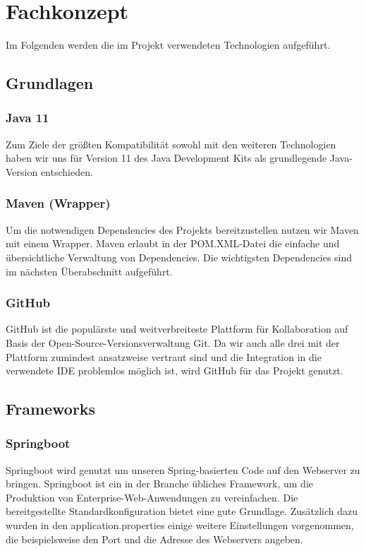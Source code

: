

\section{Fachkonzept}
\label{Technologien}

Im Folgenden werden die im Projekt verwendeten Technologien aufgeführt.

\subsection{Grundlagen}

\subsubsection*{Java 11}
Zum Ziele der größten Kompatibilität sowohl mit den weiteren Technologien haben wir uns für Version 11 des Java Development Kits als grundlegende Java-Version entschieden.
\subsubsection*{Maven (Wrapper)}
Um die notwendigen Dependencies des Projekts bereitzustellen nutzen wir Maven mit einem Wrapper. Maven erlaubt in der POM.XML-Datei die einfache und übersichtliche Verwaltung von Dependencies. Die wichtigsten Dependencies sind im nächsten Überabschnitt aufgeführt.
\subsubsection*{GitHub}
GitHub ist die populärste und weitverbreiteste Plattform für Kollaboration auf Basis der Open-Source-Versionsverwaltung Git. Da wir auch alle drei mit der Plattform zumindest ansatzweise vertraut sind und die Integration in die verwendete IDE problemlos möglich ist, wird GitHub für das Projekt genutzt.

\subsection{Frameworks}
%
\subsubsection*{Springboot}
Springboot wird genutzt um unseren Spring-basierten Code auf den Webserver zu bringen. Springboot ist ein in der Branche übliches Framework, um die Produktion von Enterprise-Web-Anwendungen zu vereinfachen. Die bereitgestellte Standardkonfiguration bietet eine gute Grundlage. Zusätzlich dazu wurden in den \glqq{}application.properties\grqq{} einige weitere Einstellungen vorgenommen, die beispielsweise den Port und die Adresse des Webservers angeben.
